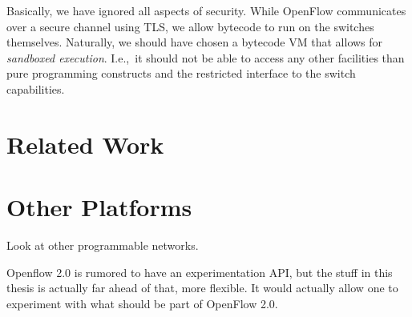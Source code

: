 Basically, we have ignored all aspects of security.  While OpenFlow
communicates over a secure channel using \ac{TLS}, we
allow bytecode to run on the switches themselves.  Naturally, we should have
chosen a bytecode \acs{VM} that allows for \textit{sandboxed execution}.
I.e.,~it should not be able to access any other facilities than pure
programming constructs and the restricted interface to the switch
capabilities.


\section{Related Work}


\section{Other Platforms}

Look at other programmable networks.

Openflow 2.0 is rumored to have an experimentation API, but the stuff in
this thesis is actually far ahead of that, more flexible.
It would actually allow one to experiment with what should be part of
OpenFlow 2.0.
